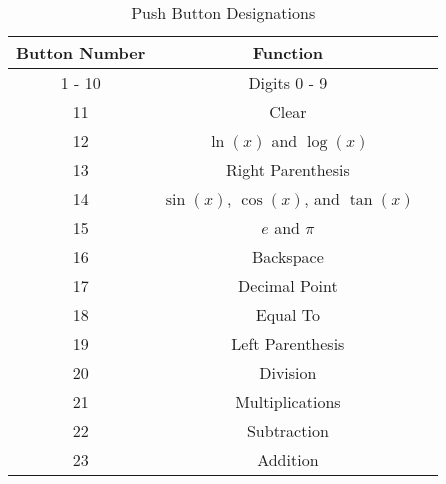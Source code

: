 \begin{table}[H]
\centering
\caption{Push Button Designations}
\label{tab:functions}
\begin{tabular}{ccc}
\toprule
Button Number & Function \\
\midrule
1 - 10 & Digits 0 - 9 \\
11 & Clear \\
12 & $\ln{(x)}$ and $\log{(x)}$ \\
13 & Right Parenthesis \\
14 & $\sin{(x)}$, $\cos{(x)}$, and $\tan{(x)}$ \\
15 & $e$ and $\pi$ \\
16 & Backspace \\
17 & Decimal Point \\
18 & Equal To \\
19 & Left Parenthesis \\
20 & Division \\
21 & Multiplications \\
22 & Subtraction \\
23 & Addition \\
\bottomrule
\end{tabular}
\end{table}
